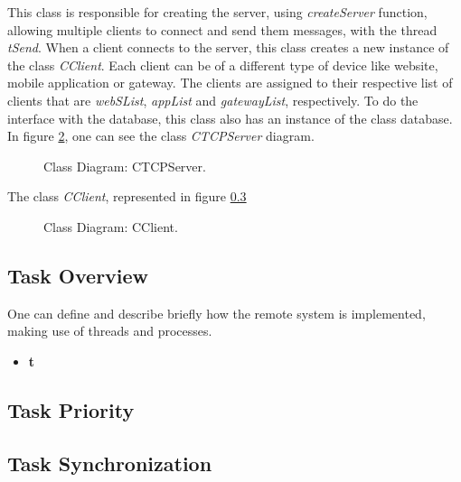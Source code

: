 This class is responsible for creating the server, using \textit{createServer} function, allowing multiple clients to connect and send them messages, with the thread \textit{tSend}. When a client connects to the server, this class creates a new instance of the class \textit{CClient}. Each client can be of a different type of device like website, mobile application or gateway. The clients are assigned to their respective list of clients that are \textit{webSList}, \textit{appList} and \textit{gatewayList}, respectively. To do the interface with the database, this class also has an instance of the class database. In figure \ref{fig:CTCPServer}, one can see the class \textit{CTCPServer} diagram.

\begin{figure}[H]
	\centering
	\caption{Class Diagram: CTCPServer.}
	\label{fig:CTCPServer}
\end{figure}

The class \textit{CClient}, represented in figure \ref{}

\begin{figure}[H]
	\centering
	\caption{Class Diagram: CClient.}
	\label{fig:CTCPServer}
\end{figure}

\subsection{Task Overview}
One can define and describe briefly how the remote system is implemented, making use of threads and processes. 

\begin{itemize}
	\item \textbf{t}
\end{itemize}

\subsection{Task Priority}

\subsection{Task Synchronization}

